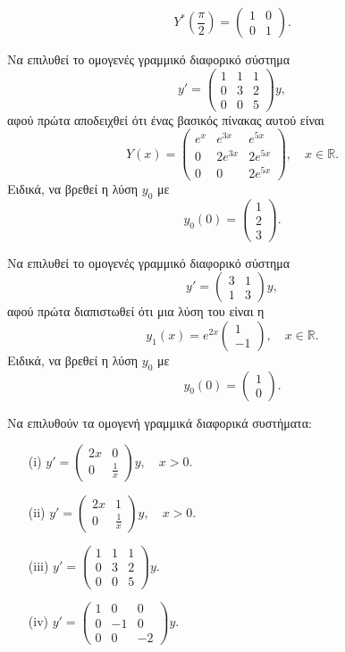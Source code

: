 \documentclass[11pt,a4paper,twoside]{book}
\begin{document}
\begin{askhseis}
\[
Y^*(\frac{\pi}{2}) = \begin{pmatrix} 1 & 0 \\ 0 & 1 \end{pmatrix}.
\]
\item Να επιλυθεί το ομογενές γραμμικό διαφορικό σύστημα
\[
y' = \begin{pmatrix} 1 & 1 & 1 \\ 0 & 3 & 2 \\ 0 & 0 & 5 \end{pmatrix} y,
\]
αφού πρώτα αποδειχθεί ότι ένας βασικός πίνακας αυτού είναι
\[
Y(x) = \begin{pmatrix} e^x & e^{3x} & e^{5x} \\ 0 & 2e^{3x} & 2e^{5x} \\ 0 & 0 & 2e^{5x} \end{pmatrix}, \quad x \in \mathbb{R}.
\]
Ειδικά, να βρεθεί η λύση $y_0$ με
\[
y_0(0) = \begin{pmatrix} 1 \\ 2 \\ 3 \end{pmatrix}.
\]
\item Να επιλυθεί το ομογενές γραμμικό διαφορικό σύστημα
\[
y' = \begin{pmatrix} 3 & 1 \\ 1 & 3 \end{pmatrix} y,
\]
αφού πρώτα διαπιστωθεί ότι μια λύση του είναι η
\[
y_1(x) = e^{2x} \begin{pmatrix} 1 \\ -1 \end{pmatrix}, \quad x \in \mathbb{R}.
\]
Ειδικά, να βρεθεί η λύση $y_0$ με
\[
y_0(0) = \begin{pmatrix} 1 \\ 0 \end{pmatrix}.
\]
\item Να επιλυθούν τα ομογενή γραμμικά διαφορικά συστήματα:


\begin{enumerate}
    \item[(i)] $y' = \begin{pmatrix} 2x & 0 \\ 0 & \frac{1}{x} \end{pmatrix} y, \quad x > 0.$
    \item[(ii)] $y' = \begin{pmatrix} 2x & 1 \\ 0 & \frac{1}{x} \end{pmatrix} y, \quad x > 0.$
    \item[(iii)] $y' = \begin{pmatrix} 1 & 1 & 1 \\ 0 & 3 & 2 \\ 0 & 0 & 5 \end{pmatrix} y.$
    \item[(iv)] $y' = \begin{pmatrix} 1 & 0 & 0 \\ 0 & -1 & 0 \\ 0 & 0 & -2 \end{pmatrix} y.$
\end{enumerate}
\end{askhseis}
\end{document}
